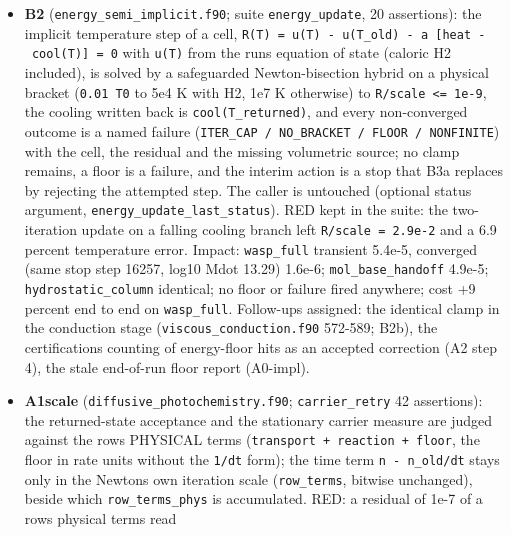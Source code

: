 \documentclass[english,a4paper]{my_memo}
\begin{document}
\begin{itemize}
  measures are judged against the physical terms of the row, transport and
  reaction, with the absolute floor; the time term stays only in the
  Newton\textquotesingle s own iteration test).
\item
  \textbf{B2} (\texttt{energy\_semi\_implicit.f90}; suite \texttt{energy\_update}, 20
  assertions): the implicit temperature step of a cell,
  \texttt{R(T)\ =\ u(T)\ -\ u(T\_old)\ -\ a\ {[}heat\ -\ cool(T){]}\ =\ 0} with \texttt{u(T)} from the
  run\textquotesingle s equation of state (caloric H2 included), is solved by a safeguarded
  Newton-bisection hybrid on a physical bracket (\texttt{0.01\ T0} to 5e4 K with
  H2, 1e7 K otherwise) to \texttt{\textbar{}R\textbar{}/scale\ \textless{}=\ 1e-9}, the cooling written back is
  \texttt{cool(T\_returned)}, and every non-converged outcome is a named failure
  (\texttt{ITER\_CAP\ /\ NO\_BRACKET\ /\ FLOOR\ /\ NONFINITE}) with the cell, the residual
  and the missing volumetric source; no clamp remains, a floor is a
  failure, and the interim action is a stop that B3a replaces by rejecting
  the attempted step. The caller is untouched (optional status argument,
  \texttt{energy\_update\_last\_status}). RED kept in the suite: the two-iteration
  update on a falling cooling branch left \texttt{\textbar{}R\textbar{}/scale\ =\ 2.9e-2} and a 6.9
  percent temperature error. Impact: \texttt{wasp\_full} transient 5.4e-5,
  converged (same stop step 16257, log10 Mdot 13.29) 1.6e-6;
  \texttt{mol\_base\_handoff} 4.9e-5; \texttt{hydrostatic\_column} identical; no floor or
  failure fired anywhere; cost +9 percent end to end on \texttt{wasp\_full}.
  Follow-ups assigned: the identical clamp in the conduction stage
  (\texttt{viscous\_conduction.f90} 572-589; B2b), the certification\textquotesingle s counting
  of energy-floor hits as an accepted correction (A2 step 4), the stale
  end-of-run floor report (A0-impl).
\item
  \textbf{A1scale} (\texttt{diffusive\_photochemistry.f90}; \texttt{carrier\_retry} 42
  assertions): the returned-state acceptance and the stationary carrier
  measure are judged against the row\textquotesingle s PHYSICAL terms (\texttt{\textbar{}transport\textbar{}\ +\ \textbar{}reaction\textbar{}\ +\ floor}, the floor in rate units without the \texttt{1/dt} form);
  the time term \texttt{\textbar{}n\ -\ n\_old\textbar{}/dt} stays only in the Newton\textquotesingle s own iteration
  scale (\texttt{row\_terms}, bitwise unchanged), beside which \texttt{row\_terms\_phys} is
  accumulated. RED: a residual of 1e-7 of a row\textquotesingle s physical terms read

\end{itemize}
\end{document}
